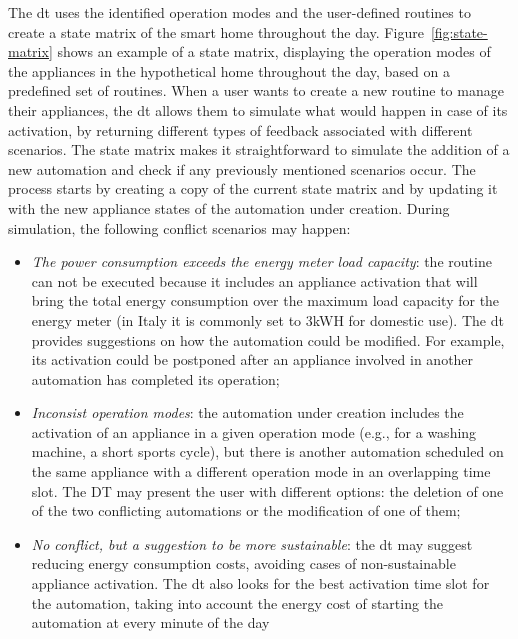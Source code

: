 The \acrshort*{dt} uses the identified operation modes and the user-defined routines to create a state matrix of the smart home throughout the day. Figure~\ref{fig:state-matrix} shows an example of a state matrix, displaying the operation modes of the appliances in the hypothetical home throughout the day, based on a predefined set of routines. When a user wants to create a new routine to manage their appliances, the \acrshort*{dt} allows them to simulate what would happen in case of its activation, by returning different types of feedback associated with different scenarios. The state matrix makes it straightforward to simulate the addition of a new automation and check if any previously mentioned scenarios occur. The process starts by creating a copy of the current state matrix and by updating it with the new appliance states of the automation under creation. During simulation, the following conflict scenarios may happen:
\begin{itemize}
    \item \textit{The power consumption exceeds the energy meter load capacity}: the routine can not be executed because it includes an appliance activation that will bring the total energy consumption over the maximum load capacity for the energy meter (in Italy it is commonly set to 3kWH for domestic use). The \acrshort*{dt} provides suggestions on how the automation could be modified. For example, its activation could be postponed after an appliance involved in another automation has completed its operation;
    \item \textit{Inconsist operation modes}: the automation under creation includes the activation of an appliance in a given operation mode (e.g., for a washing machine, a short sports cycle), but there is another automation scheduled on the same appliance with a different operation mode in an overlapping time slot. The DT may present the user with different options: the deletion of one of the two conflicting automations or the modification of one of them;
    \item \textit{No conflict, but a suggestion to be more sustainable}: the \acrshort{dt} may suggest reducing energy consumption costs, avoiding cases of non-sustainable appliance activation. The \acrshort{dt} also looks for the best activation time slot for the automation, taking into account the energy cost of starting the automation at every minute of the day
\end{itemize}

